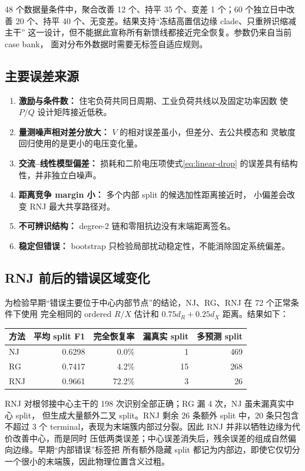 48 个数据量条件中，聚合改善 12 个、持平 35 个、变差 1 个；60 个独立日中改善
20 个、持平 40 个、无变差。结果支持“冻结高置信边缘 clade、只重辨识缩减主干”
这一设计，但不能据此宣称所有新馈线都接近完全恢复。参数仍来自当前 case bank，
面对分布外数据时需要无标签自适应规则。

\subsection{主要误差来源}

\begin{enumerate}
  \item \textbf{激励与条件数：} 住宅负荷共同日周期、工业负荷共线以及固定功率因数
  使 $P/Q$ 设计矩阵接近低秩。
  \item \textbf{量测噪声相对差分放大：} $V$ 的相对误差虽小，但差分、去公共模态和
  灵敏度回归使用的是更小的电压变化量。
  \item \textbf{交流--线性模型偏差：} 损耗和二阶电压项使式\eqref{eq:linear-drop}
  的误差具有结构性，并非独立白噪声。
  \item \textbf{距离竞争 margin 小：} 多个内部 split 的候选加性距离接近时，
  小偏差会改变 RNJ 最大共享路径对。
  \item \textbf{不可辨识结构：} degree-2 链和零阻抗边没有末端距离签名。
  \item \textbf{稳定但错误：} bootstrap 只检验局部扰动稳定性，不能消除固定系统偏差。
\end{enumerate}
\subsection{RNJ 前后的错误区域变化}

为检验早期“错误主要位于中心内部节点”的结论，NJ、RG、RNJ 在 72 个正常条件下使用
完全相同的 ordered $R/X$ 估计和 $0.75d_R+0.25d_X$ 距离。结果如下：
\begin{center}
\begin{tabular}{lrrrr}
\toprule
方法 & 平均 split F1 & 完全恢复率 & 漏真实 split & 多预测 split\\
\midrule
NJ  & 0.6298 & 0.0\%  & 1  & 469\\
RG  & 0.7417 & 4.2\%  & 15 & 268\\
RNJ & 0.9661 & 72.2\% & 3  & 26\\
\bottomrule
\end{tabular}
\end{center}
RNJ 对根邻接中心主干的 198 次识别全部正确；RG 漏 4 次，NJ 虽未漏真实中心 split，
但生成大量额外二叉 split。RNJ 剩余 26 条额外 split 中，20 条只包含不超过 3 个
terminal，表现为末端簇内部过分裂。因此 RNJ 并非以牺牲边缘为代价改善中心，而是同时
压低两类误差；中心误差消失后，残余误差的组成自然偏向边缘。早期“内部错误”标签把
所有额外隐藏 split 都记为内部边，即使它仅切分一个很小的末端簇，因此物理位置含义过粗。
